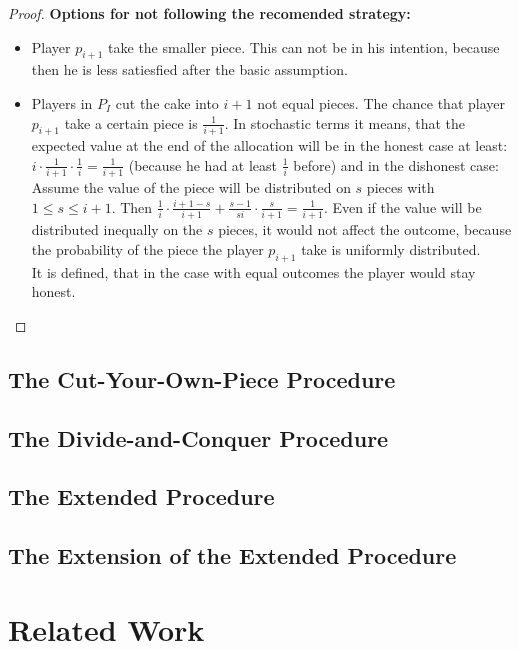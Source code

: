 \begin{proof}
\textbf{Options for not following the recomended strategy:}
\begin{itemize}
\item Player $p_{i+1}$ take the smaller piece. This can not be in his intention, because then he is less satiesfied after the basic assumption.
\item Players in $P_I$ cut the cake into $i+1$ not equal pieces. The chance that player $p_{i+1}$ take a certain piece is $\frac{1}{i+1}$. In stochastic terms it means, that the expected value at the end of the allocation will be in the honest case at least: $ i \cdot \frac{1}{i+1} \cdot \frac{1}{i} =\frac{1}{i+1} $ (because he had at least $\frac{1}{i}$ before) and in the dishonest case:\\
Assume the value of the piece will be distributed on $s$ pieces with $1 \leq s \leq i+1$. Then $ \frac{1}{i} \cdot \frac{i+1-s}{i+1} + \frac{s-1}{si}\cdot \frac{s}{i+1} =\frac{1}{i+1} $. Even if the value will be distributed inequally on the $s$ pieces, it would not affect the outcome, because the probability of the piece the player $p_{i+1}$ take is uniformly distributed.\\
 \newline It is defined, that in the case with equal outcomes the player would stay honest.
\end{itemize}
\end{proof}
\newpage
\subsection{The Cut-Your-Own-Piece Procedure}
\newpage
\subsection{The Divide-and-Conquer Procedure}
\newpage
\subsection{The Extended Procedure}
\newpage
\subsection{The Extension of the Extended Procedure}
\newpage
\section{Related Work}


\pagebreak

